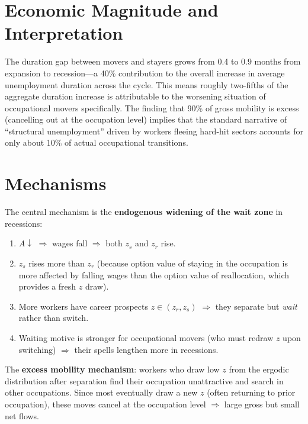 \section{Economic Magnitude and Interpretation}

The duration gap between movers and stayers grows from 0.4 to 0.9 months
from expansion to recession---a 40\% contribution to the overall increase in
average unemployment duration across the cycle. This means roughly two-fifths
of the aggregate duration increase is attributable to the worsening situation
of occupational movers specifically. The finding that 90\% of gross mobility
is excess (cancelling out at the occupation level) implies that the standard
narrative of ``structural unemployment'' driven by workers fleeing hard-hit
sectors accounts for only about 10\% of actual occupational transitions.

\section{Mechanisms}

The central mechanism is the \textbf{endogenous widening of the wait zone}
in recessions:
\begin{enumerate}
  \item $A\downarrow$ $\Rightarrow$ wages fall $\Rightarrow$ both
    $z_s$ and $z_r$ rise.
  \item $z_s$ rises more than $z_r$ (because option value of staying in the
    occupation is more affected by falling wages than the option value of
    reallocation, which provides a fresh $z$ draw).
  \item More workers have career prospects $z\in(z_r, z_s)$ $\Rightarrow$
    they separate but \emph{wait} rather than switch.
  \item Waiting motive is stronger for occupational movers (who must redraw
    $z$ upon switching) $\Rightarrow$ their spells lengthen more in recessions.
\end{enumerate}

The \textbf{excess mobility mechanism}: workers who draw low $z$ from the
ergodic distribution after separation find their occupation unattractive and
search in other occupations. Since most eventually draw a new $z$ (often
returning to prior occupation), these moves cancel at the occupation level
$\Rightarrow$ large gross but small net flows.

